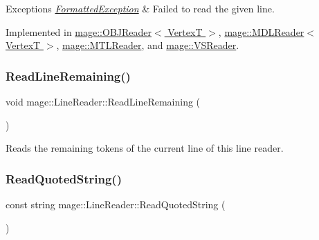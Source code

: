 \begin{DoxyExceptions}{Exceptions}
{\em \hyperlink{structmage_1_1_formatted_exception}{Formatted\+Exception}} & Failed to read the given line. \\
\hline
\end{DoxyExceptions}


Implemented in \hyperlink{classmage_1_1_o_b_j_reader_a8d4bd7be6de3098ba899cc36e3be1283}{mage\+::\+O\+B\+J\+Reader$<$ Vertex\+T $>$}, \hyperlink{classmage_1_1_m_d_l_reader_ac50f9cce64621b0a218b6778a611a702}{mage\+::\+M\+D\+L\+Reader$<$ Vertex\+T $>$}, \hyperlink{classmage_1_1_m_t_l_reader_ac3981549364be195f96b32cfafc8b147}{mage\+::\+M\+T\+L\+Reader}, and \hyperlink{classmage_1_1_v_s_reader_a3a3ba09b410e2144ed082db5f1da3113}{mage\+::\+V\+S\+Reader}.

\hypertarget{classmage_1_1_line_reader_a3a4b99bfef1e8a826d74a01bcc663fcb}{}\label{classmage_1_1_line_reader_a3a4b99bfef1e8a826d74a01bcc663fcb} 
\subsubsection{\texorpdfstring{Read\+Line\+Remaining()}{ReadLineRemaining()}}
{\footnotesize\ttfamily void mage\+::\+Line\+Reader\+::\+Read\+Line\+Remaining (\begin{DoxyParamCaption}{ }\end{DoxyParamCaption})\hspace{0.3cm}{\ttfamily [protected]}}

Reads the remaining tokens of the current line of this line reader. \hypertarget{classmage_1_1_line_reader_ae9a7547d01b29c3237b198444d4f3aef}{}\label{classmage_1_1_line_reader_ae9a7547d01b29c3237b198444d4f3aef} 
\subsubsection{\texorpdfstring{Read\+Quoted\+String()}{ReadQuotedString()}}
{\footnotesize\ttfamily const string mage\+::\+Line\+Reader\+::\+Read\+Quoted\+String (\begin{DoxyParamCaption}{ }\end{DoxyParamCaption})\hspace{0.3cm}{\ttfamily [protected]}}

